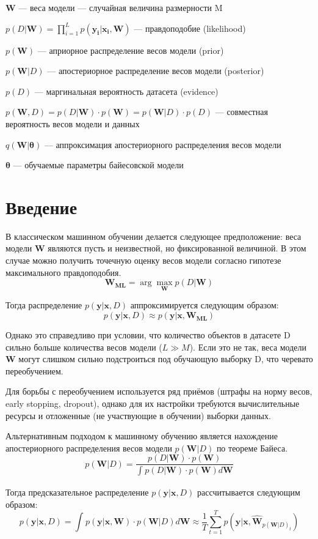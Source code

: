 \documentclass{article}
\newcommand{\argmax}{\arg\!\max}
\begin{document}
$\pmb{W}$ --- веса модели --- случайная величина размерности M

$p(D | \pmb{W}) = \prod_{i=1}^{L} p(\pmb{y_i} | \pmb{x_i}, \pmb{W})$ — правдоподобие (likelihood)

$p(\pmb{W})$ --- априорное распределение весов модели (prior)

$p(\pmb{W}| D)$ --- апостериорное распределение весов модели (posterior)

$p(D)$ --- маргинальная вероятность датасета (evidence)

$
p(\pmb{W}, D) =
p(D | \pmb{W}) \cdot p(\pmb{W}) =
p(\pmb{W}| D)\cdot p(D)
$ --- совместная вероятность весов модели и данных

$q(\pmb{W} | \pmb{\theta})$ --- аппроксимация апостериорного распределения весов модели

$\pmb{\theta}$ --- обучаемые параметры байесовской модели

\section{Введение}

В классическом машинном обучении делается следующее предположение: веса модели $\pmb{W}$ являются пусть и неизвестной, но фиксированной величиной. В этом случае можно получить точечную оценку весов модели согласно гипотезе максимального правдоподобия.
\[
 \pmb{W_{ML}} = \argmax_{\pmb{W}} p(D | \pmb{W})
\]

Тогда распределение $p(\pmb{y} | \pmb{x}, D)$ аппроксимируется следующим образом:
\[
 p(\pmb{y} | \pmb{x}, D) \approx p(\pmb{y} | \pmb{x}, \pmb{W_{ML}})
\]

Однако это справедливо при условии, что количество объектов в датасете D сильно больше количества весов модели ($L \gg M$). Если это не так, веса модели $\pmb{W}$ могут слишком сильно подстроиться под обучающую выборку D, что черевато переобучением.

Для борьбы с переобучением используется ряд приёмов (штрафы на норму весов, early stopping, dropout), однако для их настройки требуются вычислительные ресурсы и отложенные (не участвующие в обучении) выборки данных.

Альтернативным подходом к машинному обучению является нахождение апостериорного распределения весов модели $p(\pmb{W}| D)$ по теореме Байеса.
\[
 p(\pmb{W}| D) =
 \dfrac{p(D | \pmb{W}) \cdot p(\pmb{W})}{\int_{}{} p(D | \pmb{W}) \cdot p(\pmb{W}) d \pmb{W}}
\]

Тогда предсказательное распределение $p(\pmb{y} | \pmb{x}, D)$ рассчитывается следующим образом:
\[
 p(\pmb{y} | \pmb{x}, D) =
 \int_{}{} p(\pmb{y} | \pmb{x}, \pmb{W}) \cdot p(\pmb{W} | D) d \pmb{W}
 \approx \dfrac{1}{T} \sum_{t=1}^{T}{p(\pmb{y} | \pmb{x}, \hat{\pmb{W}}_{p(\pmb{W} | D)_{t}})}
\]
\end{document}
